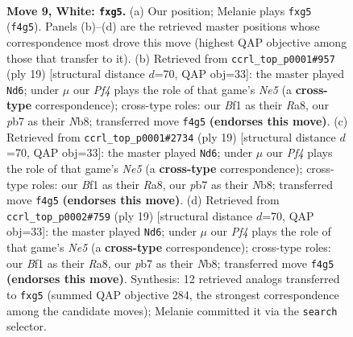 \documentclass[11pt]{article}
\begin{document}
\clearpage

\begin{figure}[p]\centering
\begin{subfigure}{0.46\textwidth}\centering
\resizebox{\linewidth}{!}{%
\newchessgame
\chessboard[
  setfen={rnb1k2r/pppnqp2/4p3/3pP1pp/N2P1P2/8/PPP3PP/R2QKBNR w KQkq - 0 9},
  showmover=false,
  pgfstyle=straightmove, color=movearrow, markmove={f4-g5}
]}
\caption{}
\end{subfigure}\hfill
\begin{subfigure}{0.46\textwidth}\centering
\resizebox{\linewidth}{!}{%
\newchessgame
\chessboard[
  setfen={rnbqk2r/1p3ppp/2p1p3/p7/P1pPn3/5NP1/1P2PPBP/RNQ1K2R b KQkq - 2 10},
  showmover=false,
  pgfstyle=straightmove, color=movearrow, markmove={e4-d6}
]}
\caption{}
\end{subfigure}
\\[4pt]
\begin{subfigure}{0.46\textwidth}\centering
\resizebox{\linewidth}{!}{%
\newchessgame
\chessboard[
  setfen={rnbqk2r/1p3ppp/2p1p3/p7/P1pPn3/5NP1/1P2PPBP/RNQ1K2R b KQkq - 2 10},
  showmover=false,
  pgfstyle=straightmove, color=movearrow, markmove={e4-d6}
]}
\caption{}
\end{subfigure}\hfill
\begin{subfigure}{0.46\textwidth}\centering
\resizebox{\linewidth}{!}{%
\newchessgame
\chessboard[
  setfen={rnbqk2r/1p3ppp/2p1p3/p7/P1pPn3/5NP1/1P2PPBP/RNQ1K2R b KQkq - 2 10},
  showmover=false,
  pgfstyle=straightmove, color=movearrow, markmove={e4-d6}
]}
\caption{}
\end{subfigure}
\caption{\textbf{Move 9, White: \texttt{fxg5}.} (a) Our position; Melanie plays \texttt{fxg5} (\texttt{f4g5}). Panels (b)--(d) are the retrieved master positions whose correspondence most drove this move (highest QAP objective among those that transfer to it). (b) Retrieved from \texttt{ccrl\_top\_p0001\#957} (ply 19) [structural distance $d$=70, QAP obj=33]: the master played \texttt{Nd6}; under $\mu$ our \emph{Pf4} plays the role of that game's \emph{Ne5} (a \textbf{cross-type} correspondence); cross-type roles: our \emph{B}f1 as their \emph{R}a8, our \emph{p}b7 as their \emph{N}b8; transferred move \texttt{f4g5} \textbf{(endorses this move)}. (c) Retrieved from \texttt{ccrl\_top\_p0001\#2734} (ply 19) [structural distance $d$=70, QAP obj=33]: the master played \texttt{Nd6}; under $\mu$ our \emph{Pf4} plays the role of that game's \emph{Ne5} (a \textbf{cross-type} correspondence); cross-type roles: our \emph{B}f1 as their \emph{R}a8, our \emph{p}b7 as their \emph{N}b8; transferred move \texttt{f4g5} \textbf{(endorses this move)}. (d) Retrieved from \texttt{ccrl\_top\_p0002\#759} (ply 19) [structural distance $d$=70, QAP obj=33]: the master played \texttt{Nd6}; under $\mu$ our \emph{Pf4} plays the role of that game's \emph{Ne5} (a \textbf{cross-type} correspondence); cross-type roles: our \emph{B}f1 as their \emph{R}a8, our \emph{p}b7 as their \emph{N}b8; transferred move \texttt{f4g5} \textbf{(endorses this move)}. Synthesis: 12 retrieved analogs transferred to \texttt{fxg5} (summed QAP objective 284, the strongest correspondence among the candidate moves); Melanie committed it via the \texttt{search} selector.}
\label{fig:thought-m16}
\end{figure}
\end{document}
